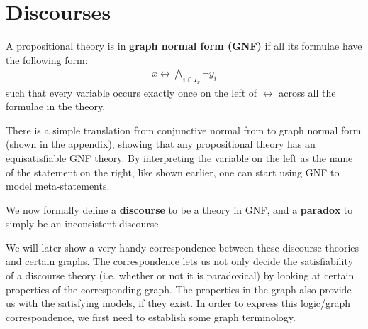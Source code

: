 \section{Discourses}
\label{sec:Discourses}
A propositional theory is in \textbf{graph normal form (GNF)} if all its formulae have the following form:
\begin{align}
  x \leftrightarrow \bigwedge_{i \in I_x} \neg y_i
\end{align}
such that every variable occurs exactly once on the left of $\leftrightarrow$ across all the formulae in the theory.

There is a simple translation from conjunctive normal from to graph normal form (shown in the appendix), showing that any propositional theory has an equisatisfiable GNF theory.
By interpreting the variable on the left as the name of the statement on the right, like shown earlier, one can start using GNF to model meta-statements.

We now formally define a \textbf{discourse} to be a theory in GNF, and a \textbf{paradox} to simply be an inconsistent discourse.

We will later show a very handy correspondence between these discourse theories and certain graphs.
The correspondence lets us not only decide the satisfiability of a discourse theory (i.e. whether or not it is paradoxical) by looking at certain properties of the corresponding graph.
The properties in the graph also provide us with the satisfying models, if they exist.
In order to express this logic/graph correspondence, we first need to establish some graph terminology.
